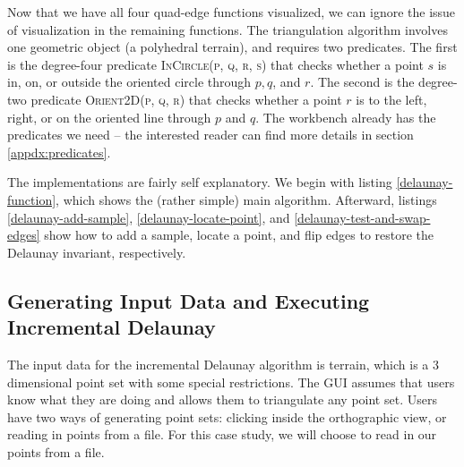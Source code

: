 Now that we have all four quad-edge functions visualized, we can ignore the
issue of visualization in the remaining functions. The triangulation algorithm
involves one geometric object (a polyhedral terrain), and requires two
predicates. The first is the degree-four predicate \textsc{InCircle(p, q, r, s)}
that checks whether a point $s$ is in, on, or outside the oriented circle
through $p, q$, and $r$. The second is the degree-two predicate
\textsc{Orient2D(p, q, r)} that checks whether a point $r$ is to the left,
right, or on the oriented line through $p$ and $q$. The workbench already has
the predicates we need -- the interested reader can find more details in
section \ref{appdx:predicates}.

The implementations are fairly self explanatory. We begin with listing
\ref{delaunay-function}, which shows the (rather simple) main algorithm.
Afterward, listings \ref{delaunay-add-sample}, \ref{delaunay-locate-point}, and
\ref{delaunay-test-and-swap-edges} show how to add a sample, locate a point, and
flip edges to restore the Delaunay invariant, respectively.
 









\FloatBarrier
\subsection{Generating Input Data and Executing Incremental Delaunay} 

The input data for the incremental Delaunay algorithm is terrain, which is a 3
dimensional point set with some special restrictions. The GUI assumes that users
know what they are doing and allows them to triangulate any point set. Users
have two ways of generating point sets: clicking inside the orthographic
view, or reading in points from a file. For this case study, we will choose to
read in our points from a file.

